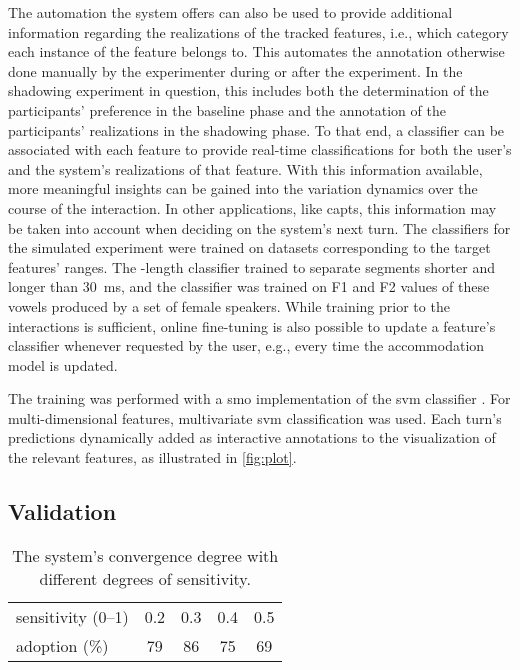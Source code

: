 The automation the system offers can also be used to provide additional information regarding the realizations of the tracked features, i.e., which category each instance of the feature belongs to.
This automates the annotation otherwise done manually by the experimenter during or after the experiment.
In the shadowing experiment in question, this includes both the determination of the participants' preference in the baseline phase and the annotation of the participants' realizations in the shadowing phase.
To that end, a classifier can be associated with each feature to provide real-time classifications for both the user's and the system's realizations of that feature.
With this information available, more meaningful insights can be gained into the variation dynamics over the course of the interaction.
In other applications, like \acp{capt}, this information may be taken into account when deciding on the system's next turn.
The classifiers for the simulated experiment were trained on datasets corresponding to the target features' ranges.
The -length classifier trained to separate segments shorter and longer than \SI{30}{\milli\second}, and the  classifier was trained on F1 and F2 values of these vowels produced by a set of female speakers.
While training prior to the interactions is sufficient, online fine-tuning is also possible to update a feature's classifier whenever requested by the user, e.g., every time the accommodation model is updated.

The training was performed with a \ac{smo} \citep{Platt1999fast, Platt1998sequential} implementation of the \ac{svm} classifier \citep{Vapnik1998support}.
For multi-dimensional features, multivariate \ac{svm} classification \citep[e.g.,][]{Joachims2005support} was used.
Each turn's predictions dynamically added as interactive annotations to the visualization of the relevant features, as illustrated in \cref{fig:plot}.

\subsection{Validation}
\label{subsec:validation}

\begin{table}[t]
	\centering
	\begin{tabularx}{\linewidth}{X*{4}{S[table-format=2.1]}}
		\toprule
		sensitivity (\numrange{0}{1}) &  0.2 &  0.3 &  0.4 &  0.5 \\
		adoption (\si{\percent})      & 79   & 86   & 75   & 69   \\
		\bottomrule
	\end{tabularx}
	\caption{The system's convergence degree with different degrees of sensitivity.}
	\label{tab:validation_baseline}
\end{table}

